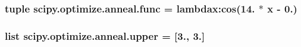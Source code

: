\subsubsection[{func}]{\setlength{\rightskip}{0pt plus 5cm}tuple scipy.\+optimize.\+anneal.\+func = lambdax\+:cos(14. $\ast$ {\bf x} -\/ 0.)}\label{namespacescipy_1_1optimize_1_1anneal_a3661d82424de8745ae3e1fa2124c7d86}
\hypertarget{namespacescipy_1_1optimize_1_1anneal_a043335cd5334b15f26ffea18942a2149}{}
\subsubsection[{upper}]{\setlength{\rightskip}{0pt plus 5cm}list scipy.\+optimize.\+anneal.\+upper = \mbox{[}3., 3.\mbox{]}}\label{namespacescipy_1_1optimize_1_1anneal_a043335cd5334b15f26ffea18942a2149}
